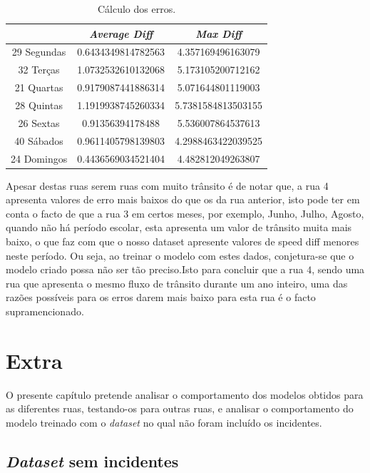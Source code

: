 \documentclass[a4paper, 12pt]{article}
\begin{document}
\begin{table}[H]
	\centering
	\begin{tabular}{||c||c|c||}
		\hline\hline
		& \textit{Average Diff} & \textit{Max Diff} \\
		\hline\hline
		29 Segundas & 
0.6434349814782563
 & 4.357169496163079\\
		\hline
		32 Terças  &
1.0732532610132068
 & 5.173105200712162 \\
		\hline
		21 Quartas & 
0.9179087441886314
 & 5.071644801119003 \\
		\hline
		28 Quintas  & 
1.1919938745260334
 & 5.7381584813503155 \\
		\hline
		26 Sextas & 0.91356394178488
 & 5.536007864537613 \\
		\hline
		40 Sábados  & 0.9611405798139803
& 4.2988463422039525 \\
		\hline
		24 Domingos & 
0.4436569034521404
 & 4.482812049263807
 \\
		\hline\hline
	\end{tabular}
	\label{table:rua4}
	\caption{Cálculo dos erros.}
\end{table}

Apesar destas ruas serem ruas com muito trânsito é de notar que, a rua 4 apresenta valores de erro mais baixos do que os da rua anterior, isto pode ter em conta o facto de que a rua 3 em certos meses, por exemplo, Junho, Julho, Agosto, quando não há período escolar, esta apresenta um valor de trânsito muita mais baixo, o que faz com que o nosso dataset apresente valores de speed diff menores neste período. Ou seja, ao treinar o modelo com estes dados, conjetura-se que o modelo criado possa não ser tão preciso.Isto para concluir que a rua $4$, sendo uma rua que apresenta o mesmo fluxo de trânsito durante um ano inteiro, uma das razões possíveis para os erros darem mais baixo para esta rua é o facto supramencionado.

\section{Extra}

O presente capítulo pretende analisar o comportamento dos modelos obtidos para as diferentes ruas, testando-os para outras ruas, e analisar o comportamento do modelo treinado com o \textit{dataset} no qual não foram incluído os incidentes.

\subsection{\textit{Dataset} sem incidentes}
\end{document}
